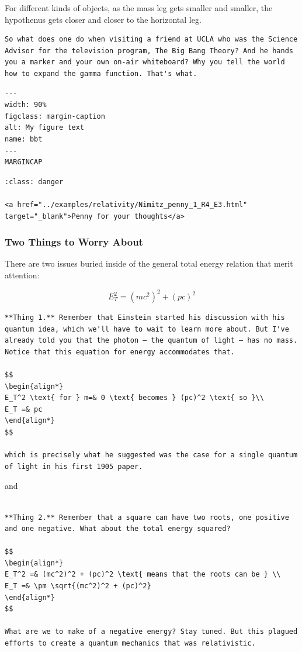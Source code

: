\documentclass[
]{article}
\begin{document}
For different kinds of objects, as the mass leg gets smaller and
smaller, the hypothenus gets closer and closer to the horizontal leg.

\begin{verbatim}
So what does one do when visiting a friend at UCLA who was the Science Advisor for the television program, The Big Bang Theory? And he hands you a marker and your own on-air whiteboard? Why you tell the world how to expand the gamma function. That's what.
\end{verbatim}

\begin{verbatim}
---
width: 90%
figclass: margin-caption
alt: My figure text
name: bbt
---
MARGINCAP
\end{verbatim}

\begin{verbatim}
:class: danger

<a href="../examples/relativity/Nimitz_penny_1_R4_E3.html" target="_blank">Penny for your thoughts</a>
\end{verbatim}

\hypertarget{two-things-to-worry-about}{%
\subsubsection{Two Things to Worry
About}\label{two-things-to-worry-about}}

There are two issues buried inside of the general total energy relation
that merit attention:

\[E_T^2 = (mc^2)^2 + (pc)^2 \nonumber\]

\begin{verbatim}
**Thing 1.** Remember that Einstein started his discussion with his quantum idea, which we'll have to wait to learn more about. But I've already told you that the photon – the quantum of light – has no mass. Notice that this equation for energy accommodates that.

$$
\begin{align*}
E_T^2 \text{ for } m=& 0 \text{ becomes } (pc)^2 \text{ so }\\
E_T =& pc
\end{align*}
$$

which is precisely what he suggested was the case for a single quantum of light in his first 1905 paper.
\end{verbatim}

and

\begin{verbatim}

**Thing 2.** Remember that a square can have two roots, one positive and one negative. What about the total energy squared?

$$
\begin{align*}
E_T^2 =& (mc^2)^2 + (pc)^2 \text{ means that the roots can be } \\
E_T =& \pm \sqrt{(mc^2)^2 + (pc)^2}
\end{align*}
$$

What are we to make of a negative energy? Stay tuned. But this plagued efforts to create a quantum mechanics that was relativistic.
\end{verbatim}
\end{document}
